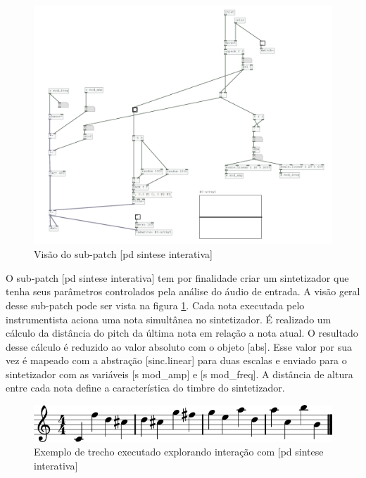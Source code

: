 \documentclass[draft]{ppgmus}
\begin{document}
\begin{figure}
\includegraphics[scale=.5]{sintese}
\caption{Visão do sub-patch [pd sintese interativa]}
\label{sintese}
\end{figure}

O sub-patch [pd sintese interativa] tem por finalidade criar um sintetizador que tenha
seus parâmetros controlados pela análise do áudio de entrada. A visão geral desse sub-patch pode
ser vista na figura \ref{sintese}.
Cada nota executada pelo
instrumentista aciona uma nota simultânea no sintetizador. É realizado um cálculo da distância
do pitch da última nota em relação a nota atual. O resultado desse cálculo é reduzido ao valor
absoluto com o objeto [abs]. Esse valor por sua vez é mapeado com a abstração [sinc.linear] para
duas escalas e enviado para o sintetizador com as variáveis [s mod\_amp] e [s mod\_freq].
A distância de altura entre cada nota define a característica do timbre do sintetizador.



\begin{figure}
\includegraphics[scale=.6]{part1}
\caption{Exemplo de trecho executado explorando interação com [pd sintese interativa]}
\label{part1}
\end{figure}
\end{document}
